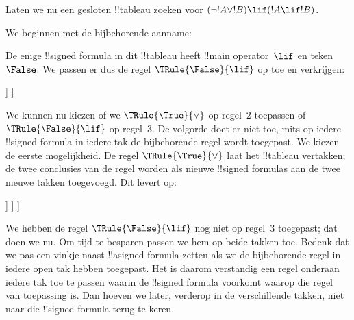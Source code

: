 \documentclass[../../../include/open-logic-section]{subfiles}
\begin{document}
\begin{ex}
Laten we nu een gesloten !!{tableau} zoeken voor
$(\lnot !A \lor !B) \lif (!A \lif !B)$.

We beginnen met de bijbehorende aanname:
\begin{oltableau}
  [\sFmla{\False}{(\lnot \formula{A} \lor \formula{B}) \lif
      (\formula{A} \lif \formula{B})}, just=\TAss]
\end{oltableau}
De enige !!{signed formula} in dit !!{tableau} heeft
!!{main operator}~$\lif$ en teken~$\False$. We passen er dus de regel
$\TRule{\False}{\lif}$ op toe en verkrijgen:
\begin{oltableau}
  [\sFmla{\False}{(\lnot \formula{A} \lor \formula{B})
      \lif (\formula{A} \lif \formula{B})}, just=\TAss, checked
    [\sFmla{\True}{\lnot \formula{A} \lor \formula{B}},
      just={\TRule{\False}{\lif}[1]}
      [\sFmla{\False}{(\formula{A} \lif \formula{B})},
        just={\TRule{\False}{\lif}[1]}
      ]
    ]
  ]
\end{oltableau}
We kunnen nu kiezen of we $\TRule{\True}{\lor}$ op regel~$2$ toepassen
of $\TRule{\False}{\lif}$ op regel~$3$. De volgorde doet er niet toe,
mits op iedere !!{signed formula} in iedere tak de bijbehorende regel
wordt toegepast. We kiezen de eerste mogelijkheid. De regel
$\TRule{\True}{\lor}$ laat het !!{tableau} vertakken; de twee conclusies
van de regel worden als nieuwe !!{signed formula}s aan de twee nieuwe
takken toegevoegd. Dit levert op:
\begin{oltableau}
  [\sFmla{\False}{(\lnot \formula{A} \lor \formula{B}) \lif
      (\formula{A} \lif \formula{B})}, just=\TAss, checked
    [\sFmla{\True}{\lnot \formula{A} \lor \formula{B}},
      just={\TRule{\False}{\lif}[1]}, checked
      [\sFmla{\False}{(\formula{A} \lif \formula{B})},
        just={\TRule{\False}{\lif}[1]}
        [\sFmla{\True}{\lnot \formula{A}}, just={\TRule{\True}{\lor}[2]}]
        [\sFmla{\True}{\formula{B}}, just={\TRule{\True}{\lor}[2]}]
      ]
    ]
  ]
\end{oltableau}
We hebben de regel $\TRule{\False}{\lif}$ nog niet op regel~$3$
toegepast; dat doen we nu. Om tijd te besparen passen we hem op beide
takken toe. Bedenk dat we pas een vinkje naast !!a{signed formula}
zetten als we de bijbehorende regel in iedere open tak hebben toegepast.
Het is daarom verstandig een regel onderaan iedere tak toe te passen
waarin de !!{signed formula} voorkomt waarop die regel van toepassing
is. Dan hoeven we later, verderop in de verschillende takken, niet naar
die !!{signed formula} terug te keren.

\end{ex}
\end{document}
